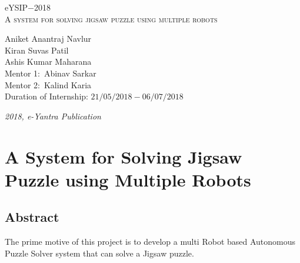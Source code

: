 \documentclass[a4paper,12pt,oneside]{book}
\begin{document}
\begin{titlepage}
\raggedright
{\Large eYSIP$-$2018\\[1 cm]}
{\Huge\scshape A system for solving jigsaw puzzle using multiple robots\\[.1 in]}
\vfill
\begin{flushright}
{\large Aniket Anantraj Navlur \\}
{\large Kiran Suvas Patil\\}
{\large Ashis Kumar Maharana\\}
{\large Mentor 1$:$ Abinav Sarkar\\}
{\large Mentor 2$:$ Kalind Karia\\}
{\large Duration of Internship: $ 21/05/2018-06/07/2018 $ \\}
\end{flushright}

{\itshape 2018, e-Yantra Publication}
\end{titlepage}

\chapter[Project Tag]{A System for Solving Jigsaw Puzzle using Multiple Robots}
\section*{Abstract}
The prime motive of this project is to develop a multi Robot based \hspace{0 em} Autonomous Puzzle Solver system that can solve a Jigsaw puzzle.
\end{document}
